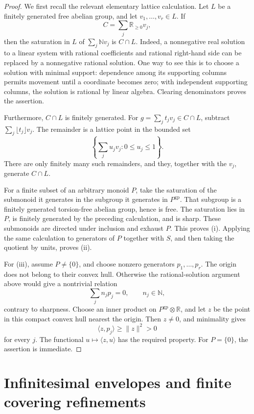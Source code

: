 \documentclass[11pt]{article}
\theoremstyle{definition}
\theoremstyle{remark}
\newcommand{\gp}{\mathrm{gp}}
\newcommand{\NN}{\mathbb N}
\newcommand{\RR}{\mathbb R}
\begin{document}
\begin{proof}
We first recall the relevant elementary lattice calculation.
Let \(L\) be a finitely generated free abelian group, and let
\(v_1,\ldots,v_r\in L\). If
\[
C=\sum_j\RR_{\ge0}v_j,
\]
then the saturation in \(L\) of \(\sum_j\NN v_j\) is \(C\cap L\).
Indeed, a nonnegative real solution to a linear system with rational
coefficients and rational right-hand side can be replaced by a
nonnegative rational solution. One way to see this is to choose a
solution with minimal support: dependence among its supporting
columns permits movement until a coordinate becomes zero; with
independent supporting columns, the solution is rational by linear
algebra. Clearing denominators proves the assertion.

Furthermore, \(C\cap L\) is finitely generated. For
\(g=\sum_j t_jv_j\in C\cap L\), subtract
\(\sum_j\lfloor t_j\rfloor v_j\). The remainder is a lattice point in
the bounded set
\[
\left\{\sum_j u_jv_j:0\le u_j\le1\right\}.
\]
There are only finitely many such remainders, and they, together
with the \(v_j\), generate \(C\cap L\).

For a finite subset of an arbitrary monoid \(P\), take the
saturation of the submonoid it generates in the subgroup it
generates in \(P^{\gp}\). That subgroup is a finitely generated
torsion-free abelian group, hence is free. The saturation lies in
\(P\), is finitely generated by the preceding calculation, and is
sharp. These submonoids are directed under inclusion and exhaust
\(P\). This proves (i). Applying the same calculation to generators
of \(P\) together with \(S\), and then taking the quotient by units,
proves (ii).

For (iii), assume \(P\ne\{0\}\), and choose nonzero generators
\(p_1,\ldots,p_r\). The origin does not belong to their convex hull.
Otherwise the rational-solution argument above would give a
nontrivial relation
\[
\sum_j n_jp_j=0,\qquad n_j\in\NN,
\]
contrary to sharpness. Choose an inner product on
\(P^{\gp}\otimes\RR\), and let \(z\) be the point in this compact
convex hull nearest the origin. Then \(z\ne0\), and minimality gives
\[
\langle z,p_j\rangle\ge \lVert z\rVert^2>0
\]
for every \(j\). The functional \(u\mapsto\langle z,u\rangle\)
has the required property. For \(P=\{0\}\), the assertion is
immediate.
\end{proof}

\section{Infinitesimal envelopes and finite covering refinements}
\end{document}
